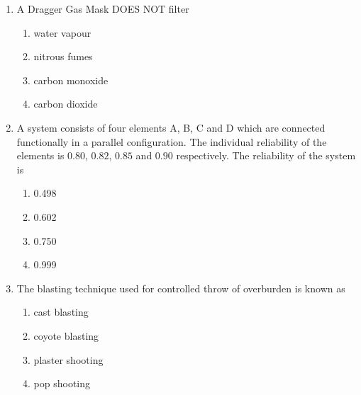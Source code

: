 \documentclass[journal]{IEEEtran}
\begin{document}
\begin{enumerate}[leftmargin=0pt]
\item A Dragger Gas Mask DOES NOT filter
\begin{multicols}{2}
\begin{enumerate}[label=(\Alph*), itemsep=0pt, topsep=2pt]
  \item water vapour
  \item nitrous fumes
  \item carbon monoxide
  \item carbon dioxide
\end{enumerate}
\end{multicols}
\hfill{}

\item A system consists of four elements A, B, C and D which are connected functionally in a parallel
configuration. The individual reliability of the elements is $0.80$, $0.82$, $0.85$ and $0.90$
respectively. The reliability of the system is
\begin{multicols}{2}
\begin{enumerate}[label=(\Alph*), itemsep=0pt, topsep=2pt]
  \item 0.498
  \item 0.602
  \item 0.750
  \item 0.999
\end{enumerate}
\end{multicols}
\hfill{}

\item The blasting technique used for controlled throw of overburden is known as
\begin{multicols}{2}
\begin{enumerate}[label=(\Alph*), itemsep=0pt, topsep=2pt]
  \item cast blasting
  \item coyote blasting
  \item plaster shooting
  \item pop shooting
\end{enumerate}
\end{multicols}
\hfill{}


\end{enumerate}
\end{document}
